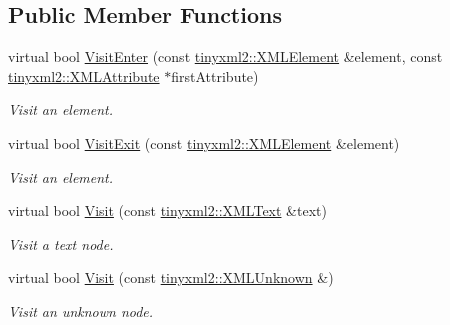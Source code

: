 \subsection*{Public Member Functions}
\begin{DoxyCompactItemize}
\item 
\mbox{\label{classXmlSaxHander_aaa7fa80276807a757b74c5fb6e81e372}} 
virtual bool \hyperlink{classXmlSaxHander_aaa7fa80276807a757b74c5fb6e81e372}{Visit\+Enter} (const \hyperlink{classtinyxml2_1_1XMLElement}{tinyxml2\+::\+X\+M\+L\+Element} \&element, const \hyperlink{classtinyxml2_1_1XMLAttribute}{tinyxml2\+::\+X\+M\+L\+Attribute} $\ast$first\+Attribute)
\begin{DoxyCompactList}\small\item\em Visit an element. \end{DoxyCompactList}\item 
\mbox{\label{classXmlSaxHander_a8e97b61cf6f4fdd0fb913026e22cf069}} 
virtual bool \hyperlink{classXmlSaxHander_a8e97b61cf6f4fdd0fb913026e22cf069}{Visit\+Exit} (const \hyperlink{classtinyxml2_1_1XMLElement}{tinyxml2\+::\+X\+M\+L\+Element} \&element)
\begin{DoxyCompactList}\small\item\em Visit an element. \end{DoxyCompactList}\item 
\mbox{\label{classXmlSaxHander_a32fd20d7a9a920a67ca68866b20e92fa}} 
virtual bool \hyperlink{classXmlSaxHander_a32fd20d7a9a920a67ca68866b20e92fa}{Visit} (const \hyperlink{classtinyxml2_1_1XMLText}{tinyxml2\+::\+X\+M\+L\+Text} \&text)
\begin{DoxyCompactList}\small\item\em Visit a text node. \end{DoxyCompactList}\item 
\mbox{\label{classXmlSaxHander_a33ff44d4e7c86a5acfb5fbd80f2eee4c}} 
virtual bool \hyperlink{classXmlSaxHander_a33ff44d4e7c86a5acfb5fbd80f2eee4c}{Visit} (const \hyperlink{classtinyxml2_1_1XMLUnknown}{tinyxml2\+::\+X\+M\+L\+Unknown} \&)
\begin{DoxyCompactList}\small\item\em Visit an unknown node. \end{DoxyCompactList}\item 

\end{DoxyCompactItemize}
